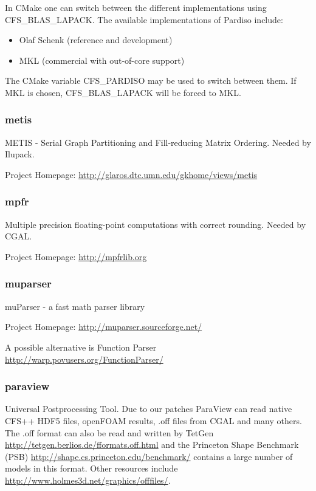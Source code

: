 In  CMake   one  can  switch  between  the   different  implementations  using
CFS\_BLAS\_LAPACK. The available implementations of Pardiso include:

\begin{itemize}
\item Olaf Schenk (reference and development)
\item MKL (commercial with out-of-core support) 
\end{itemize}

The CMake variable  CFS\_PARDISO may be used to switch between  them. If MKL is
chosen, CFS\_BLAS\_LAPACK will be forced to MKL.

\subsubsection{metis}  METIS  - Serial  Graph  Partitioning and  Fill-reducing
Matrix Ordering.  Needed by Ilupack.

\noindent Project Homepage: \url{http://glaros.dtc.umn.edu/gkhome/views/metis}

\subsubsection{mpfr}  Multiple   precision  floating-point  computations  with
correct rounding.  Needed by CGAL.

\noindent Project Homepage: \url{http://mpfrlib.org}

\subsubsection{muparser} muParser - a fast math parser library

\noindent Project Homepage: \url{http://muparser.sourceforge.net/}

A possible alternative is Function Parser \url{http://warp.povusers.org/FunctionParser/}

\subsubsection{paraview} 

Universal Postprocessing  Tool. Due  to our patches  ParaView can  read native
CFS++ HDF5 files, openFOAM results, .off  files from CGAL and many others. The
.off    format    can    also     be    read    and    written    by    TetGen
\url{http://tetgen.berlios.de/fformats.off.html}   and  the   Princeton  Shape
Benchmark  (PSB)   \url{http://shape.cs.princeton.edu/benchmark/}  contains  a
large   number   of  models   in   this   format.   Other  resources   include
\url{http://www.holmes3d.net/graphics/offfiles/}.



